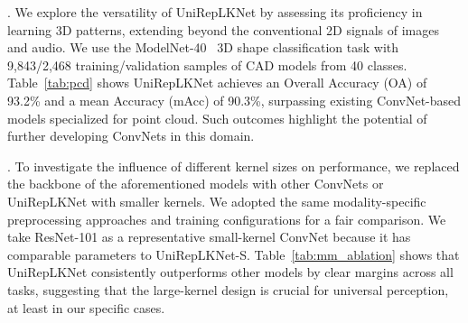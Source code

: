 \documentclass[10pt,twocolumn,letterpaper]{article}
\begin{document}
. We explore the versatility of UniRepLKNet by assessing its proficiency in learning 3D patterns, extending beyond the conventional 2D signals of images and audio. We use the ModelNet-40~\cite{wu2015modelnet} 3D shape classification task with 9,843/2,468 training/validation samples of CAD models from 40 classes. Table~\ref{tab:pcd} shows UniRepLKNet achieves an Overall Accuracy (OA) of 93.2\% and a mean Accuracy (mAcc) of 90.3\%, surpassing existing ConvNet-based models specialized for point cloud. Such outcomes highlight the potential of further developing ConvNets in this domain.

. To investigate the influence of different kernel sizes on performance, we replaced the backbone of the aforementioned models with other ConvNets or UniRepLKNet with smaller kernels. We adopted the same modality-specific preprocessing approaches and training configurations for a fair comparison. We take ResNet-101 as a representative small-kernel ConvNet because it has comparable parameters to UniRepLKNet-S. Table~\ref{tab:mm_ablation} shows that UniRepLKNet consistently outperforms other models by clear margins across all tasks, suggesting that the large-kernel design is crucial for universal perception, at least in our specific cases. 
\begin{table}[t]
    \centering
    \caption{Universal perception performance with other ConvNets or UniRepLKNet with a smaller kernel size.}
    \vspace{-0.1in}
    \centering
    \label{tab:mm_ablation}
    \vspace{-0.2in}
\end{table}
\end{document}
